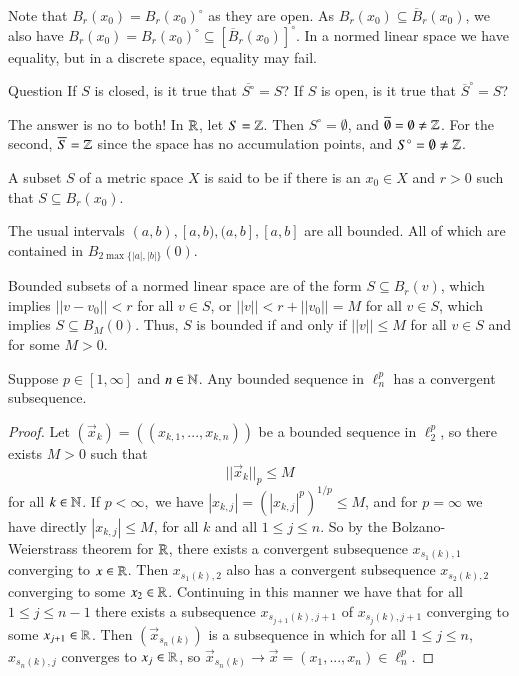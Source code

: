 \begin{example}
    Note that $B_r(x_0) = B_r(x_0)^{\circ}$ as they are open. As $B_r(x_0) \subseteq \overline{B}_r(x_0)$, we also have $B_r(x_0) = B_r(x_0)^{\circ} \subseteq [\overline{B}_r(x_0)]^{\circ}$. In a normed linear space we have equality, but in a discrete space, equality may fail. 
\end{example}

\begin{question}{Question}
    If $S$ is closed, is it true that $\overline{S^{\circ}} = S$? If $S$ is open, is it true that $\overline{S}^{\circ} = S$?
\end{question}
The answer is no to both! In $\mathbb R$, let $S = \mathbb Z$. Then $S^{\circ} = \emptyset$, and $\overline{\emptyset} = \emptyset \neq \mathbb Z$. For the second, $\overline{S} = \mathbb Z$ since the space has no accumulation points, and $S^{\circ} = \emptyset \neq \mathbb Z$.


\begin{definition}
    A subset $S$ of a metric space $X$ is said to be  if there is an $x_0 \in X$ and $r > 0$ such that $S \subseteq B_r(x_0)$.
\end{definition}

\begin{example}
    The usual intervals $(a,b),[a,b),(a,b],[a,b]$ are all bounded. All of which are contained in $B_{2\max\{|a|,|b|\}}(0)$.
\end{example}

\begin{example}
    Bounded subsets of a normed linear space are of the form $S \subseteq B_r(v)$, which implies $||v-v_0|| < r$ for all $v \in S$, or $||v|| < r+||v_0|| = M$ for all $v \in S$, which implies $S \subseteq B_M(0)$. Thus, $S$ is bounded if and only if $||v|| \leq M$ for all $v \in S$ and for some $M > 0$.
\end{example}

\begin{theorem}
    Suppose $p \in [1,\infty]$ and $n \in \mathbb N$. Any bounded sequence in $\ell_n^p$ has a convergent subsequence.
\end{theorem}
\begin{proof}
    Let $(\vec{x}_k) = ((x_{k,1},...,x_{k,n}))$ be a bounded sequence in $\ell_2^p$, so there exists $M > 0$ such that $$||\vec{x}_k||_p \leq M$$ for all $k \in \mathbb N$. If $p < \infty,$ we have $|x_{k,j}| = (|x_{k,j}|^p)^{1/p} \leq M$, and for $p = \infty$ we have directly $|x_{k,j}| \leq M$, for all $k$ and all $1 \leq j \leq n$. So by the Bolzano-Weierstrass theorem for $\mathbb R$, there exists a convergent subsequence $x_{s_1(k),1}$ converging to $x \in \mathbb R$. Then $x_{s_1(k),2}$ also has a convergent subsequence $x_{s_2(k),2}$ converging to some $x_2 \in \mathbb R$. Continuing in this manner we have that for all $1\leq j \leq n-1$ there exists a subsequence $x_{s_{j+1}(k),j+1}$ of $x_{s_j(k),j+1}$ converging to some $x_{j+1} \in \mathbb R$. Then $(\vec{x}_{s_n(k)})$ is a subsequence in which for all $1 \leq j \leq n$, $x_{s_n(k),j}$ converges to $x_j \in \mathbb R$, so $\vec{x}_{s_n(k)}\rightarrow \vec{x} = (x_1,...,x_n) \in \ell_n^p$. 
\end{proof}


